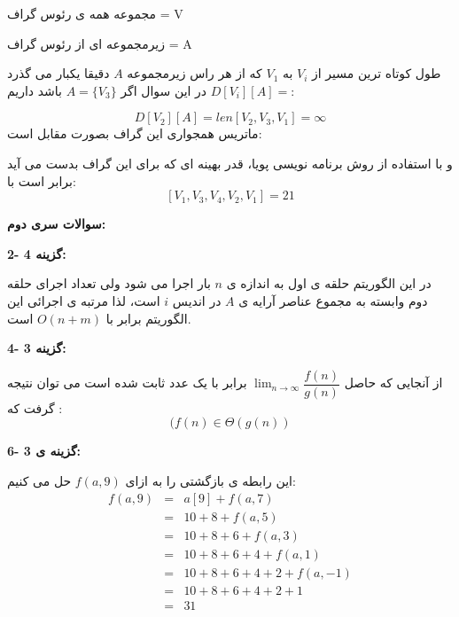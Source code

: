 \documentclass[12pt,fleqn,a4paper]{article}
\begin{document}
مجموعه همه ی رئوس گراف = V

زیرمجموعه ای از رئوس گراف = A

طول کوتاه ترین مسیر از $V_i$  به $V_1$ که از هر راس زیرمجموعه $A$ دقیقا یکبار می گذرد
$ D[V_i][A]=$
در این سوال اگر $A=\{V_3\}$ باشد داریم:

$$D[V_2][A]=len[V_2,V_3,V_1]=\infty$$
ماتریس همجواری این گراف بصورت مقابل است:

\begin{center}
\end{center}

و با استفاده از روش برنامه نویسی پویا، قدر بهینه ای که برای این گراف بدست می آید برابر است با:
\[
[V_1, V_3, V_4, V_2, V_1]=21
\]

\vspace{2cm}
\begin{center}

{\bf سوالات سری دوم:}
\end{center}
{\bf 2- گزینه 4:}

در این الگوریتم حلقه ی اول به اندازه ی $n$ بار اجرا می شود ولی تعداد اجرای حلقه دوم وابسته به مجموع عناصر آرایه ی $A$ در اندیس $i$ است، لذا مرتبه ی اجرائی این الگوریتم برابر با $O(n+m)$ است.

{\bf 4- گزینه 3:}

از آنجایی که حاصل $\lim_{n\to\infty}\dfrac{f(n)}{g(n)}$ برابر با یک عدد ثابت شده است می توان نتیجه گرفت که :
$$(f(n)\in\Theta\left(g(n)\right)$$

{\bf 6- گزینه ی 3:}

این رابطه ی بازگشتی را به ازای $f(a,9)$ حل می کنیم:
\begin{eqnarray*}
f(a,9)
&=& a[9] + f(a,7) \\
&=& 10 + 8 + f(a,5) \\
&=& 10 + 8 + 6 + f(a,3) \\
&=& 10 + 8 + 6 + 4 + f(a,1) \\
&=& 10 + 8 + 6 + 4 + 2 + f(a,-1) \\
&=& 10 + 8 + 6 + 4 + 2 + 1 \\
&=& 31
\end{eqnarray*}
\end{document}
